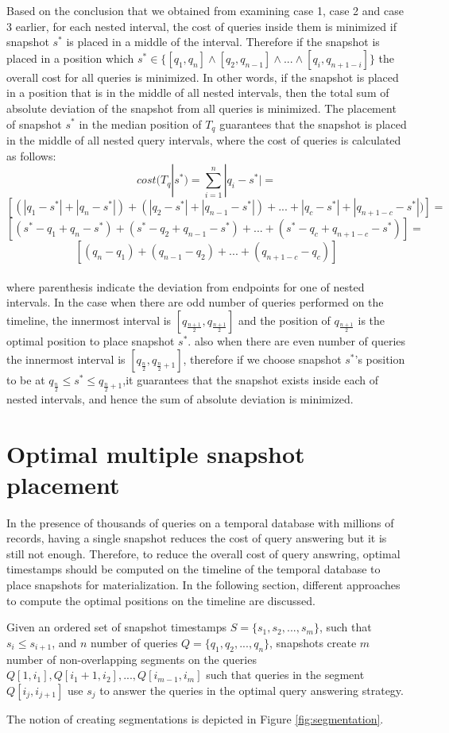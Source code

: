 			Based on the conclusion that we obtained from examining case 1, case 2 and case 3 earlier, for each nested interval, the cost of queries inside them is minimized if snapshot $s^*$ is placed in a middle of the interval. Therefore if the snapshot is placed in a position which $s^*\in \{ [q_1,q_n] \wedge [q_2,q_{n-1}] \wedge ... \wedge [q_i,q_{n+1-i}] \}$ the overall cost for all queries is minimized. In other words, if the snapshot is placed in a position that is in the middle of all nested intervals, then the total sum of absolute deviation of the snapshot from all queries is minimized. The placement of snapshot $s^*$ in the median position of $T_q$ guarantees that the snapshot is placed in the middle of all nested query intervals, where the cost of queries is calculated as follows:
			$$cost(T_q|s^*)=\sum_{i=1}^n |q_i-s^*| = $$
			$$[(|q_1-s^*|+|q_n-s^*|)+(|q_2-s^*|+|q_{n-1}-s^*|)+...+|q_c-s^*|+|q_{n+1-c}-s^*|)]=$$
			$$[(s^*-q_1+q_n-s^*)+(s^*-q_2+q_{n-1}-s^*)+...+(s^*-q_c+q_{n+1-c}-s^*)]=$$
			$$[(q_n-q_1)+(q_{n-1}-q_2)+...+(q_{n+1-c}-q_c)]$$\\
			where parenthesis indicate the deviation from endpoints for one of nested intervals. In the case when there are odd number of queries performed on the timeline, the innermost interval is $[q_{\frac{n+1}{2}},q_{\frac{n+1}{2}}]$ and the position of $q_{\frac{n+1}{2}}$ is the optimal position to place snapshot $s^*$. also when there are even number of queries the innermost interval is $[q_{\frac{n}{2}},q_{\frac{n}{2}+1}]$, therefore if we choose snapshot $s^*$'s position to be at $q_{\frac{n}{2}}\leq s^*\leq q_{\frac{n}{2}+1}$,it guarantees that the snapshot exists inside each of nested intervals, and hence the sum of absolute deviation is minimized. 


	\section{Optimal multiple snapshot placement} \label{sec:optimal_multiple_snapshot} \label{sec:optimal_multiple_snapshot}
		In the presence of thousands of queries on a temporal database with millions of records, having a single snapshot reduces the cost of query answering but it is still not enough. Therefore, to reduce the overall cost of query answring, optimal timestamps should be computed on the timeline of the temporal database to place snapshots for materialization. In the following section, different approaches to compute the optimal positions on the timeline are discussed.

		\begin{prop} 
			Given an ordered set of snapshot timestamps $S=\{s_1,s_2,...,s_m\}$, such that $s_i \leq s_{i+1}$, and $n$ number of queries $Q = \{q_1,q_2,...,q_n\}$, snapshots create $m$ number of non-overlapping segments on the queries $Q[1,i_1],Q[i_1+1,i_2],...,Q[i_{m-1},i_m]$ such that queries in the segment $Q[i_j,i_{j+1}]$ use $s_j$ to answer the queries in the optimal query answering strategy.
		\label{prop:segmentation_of_queries}
		\end{prop}
		The notion of creating segmentations is depicted in Figure \ref{fig:segmentation}.

